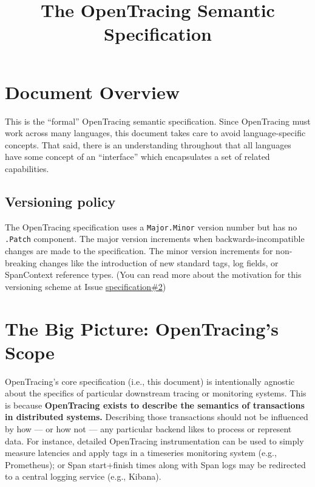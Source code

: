 \documentclass[a4paper,12pt,notitlepage,twoside,openright]{article}
\title{The OpenTracing Semantic Specification}
\author{}
\date{}
\begin{document}
\maketitle

\hypertarget{document-overview}{%
\section{Document Overview}\label{document-overview}}

This is the ``formal'' OpenTracing semantic specification. Since
OpenTracing must work across many languages, this document takes care to
avoid language-specific concepts. That said, there is an understanding
throughout that all languages have some concept of an ``interface''
which encapsulates a set of related capabilities.

\hypertarget{versioning-policy}{%
\subsection{Versioning policy}\label{versioning-policy}}

The OpenTracing specification uses a \texttt{Major.Minor} version number
but has no \texttt{.Patch} component. The major version increments when
backwards-incompatible changes are made to the specification. The minor
version increments for non-breaking changes like the introduction of new
standard tags, log fields, or SpanContext reference types. (You can read
more about the motivation for this versioning scheme at Issue
\href{https://github.com/opentracing/specification/issues/2\#issuecomment-261740811}{specification\#2})

\hypertarget{the-big-picture-opentracings-scope}{%
\section{The Big Picture: OpenTracing's
Scope}\label{the-big-picture-opentracings-scope}}

OpenTracing's core specification (i.e., this document) is intentionally
agnostic about the specifics of particular downstream tracing or
monitoring systems. This is because \textbf{OpenTracing exists to
describe the semantics of transactions in distributed systems.}
Describing those transactions should not be influenced by how --- or how
not --- any particular backend likes to process or represent data. For
instance, detailed OpenTracing instrumentation can be used to simply
measure latencies and apply tags in a timeseries monitoring system
(e.g., Prometheus); or Span start+finish times along with Span logs may
be redirected to a central logging service (e.g., Kibana).
\end{document}
